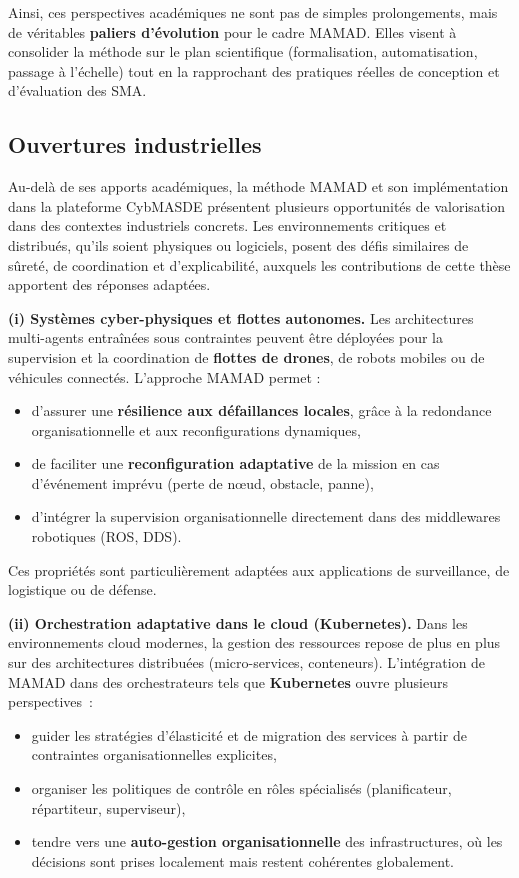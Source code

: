 \medskip
\noindent
Ainsi, ces perspectives académiques ne sont pas de simples prolongements, mais de véritables \textbf{paliers d’évolution} pour le cadre MAMAD.
Elles visent à consolider la méthode sur le plan scientifique (formalisation, automatisation, passage à l’échelle) tout en la rapprochant des pratiques réelles de conception et d’évaluation des SMA.

\subsection*{Ouvertures industrielles}

Au-delà de ses apports académiques, la méthode \ac{MAMAD} et son implémentation dans la plateforme \ac{CybMASDE} présentent plusieurs opportunités de valorisation dans des contextes industriels concrets.
Les environnements critiques et distribués, qu’ils soient physiques ou logiciels, posent des défis similaires de sûreté, de coordination et d’explicabilité, auxquels les contributions de cette thèse apportent des réponses adaptées.

\medskip
\noindent
\textbf{(i) Systèmes cyber-physiques et flottes autonomes.}
Les architectures multi-agents entraînées sous contraintes peuvent être déployées pour la supervision et la coordination de \textbf{flottes de drones}, de robots mobiles ou de véhicules connectés.
L’approche MAMAD permet :
\begin{itemize}
  \item d’assurer une \textbf{résilience aux défaillances locales}, grâce à la redondance organisationnelle et aux reconfigurations dynamiques,
  \item de faciliter une \textbf{reconfiguration adaptative} de la mission en cas d’événement imprévu (perte de nœud, obstacle, panne),
  \item d’intégrer la supervision organisationnelle directement dans des middlewares robotiques (ROS, DDS).
\end{itemize}
Ces propriétés sont particulièrement adaptées aux applications de surveillance, de logistique ou de défense.

\medskip
\noindent
\textbf{(ii) Orchestration adaptative dans le cloud (Kubernetes).}
Dans les environnements cloud modernes, la gestion des ressources repose de plus en plus sur des architectures distribuées (micro-services, conteneurs).
L’intégration de MAMAD dans des orchestrateurs tels que \textbf{Kubernetes} ouvre plusieurs perspectives~:
\begin{itemize}
  \item guider les stratégies d’élasticité et de migration des services à partir de contraintes organisationnelles explicites,
  \item organiser les politiques de contrôle en rôles spécialisés (planificateur, répartiteur, superviseur),
  \item tendre vers une \textbf{auto-gestion organisationnelle} des infrastructures, où les décisions sont prises localement mais restent cohérentes globalement.
\end{itemize}


